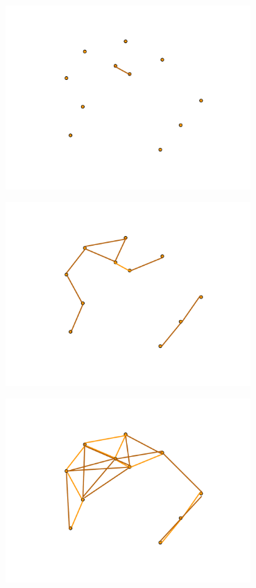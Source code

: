 \documentclass{beamer}
\begin{document}
\begin{frame}
  \begin{center}
    \includegraphics[height=7cm]{images/data_nosource_1}
  \end{center}
\end{frame}
\begin{frame}
  \begin{center}
    \includegraphics[height=7cm]{images/data_nosource_2}
  \end{center}
\end{frame}
\begin{frame}
  \begin{center}
    \includegraphics[height=7cm]{images/data_nosource_3}
  \end{center}
\end{frame}
\end{document}
